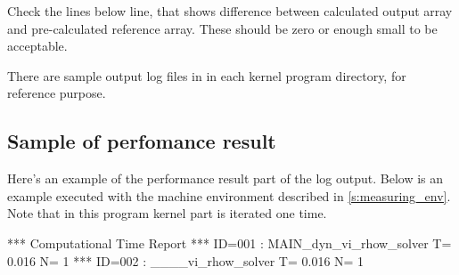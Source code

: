 Check the lines below  line,
that shows difference between calculated output array and
pre-calculated reference array.
These should be zero or enough small to be acceptable.

There are sample output log files in  
in each kernel program directory, for reference purpose.



\subsection{Sample of perfomance result}

Here's an example of the performance result part of the log output.
Below is an example executed with the machine environment described in \autoref{s:measuring_env}.
%
Note that in this program kernel part is iterated one time.

\begin{LstLog}
 *** Computational Time Report
 *** ID=001 : MAIN_dyn_vi_rhow_solver          T=     0.016 N=      1
 *** ID=002 : ____vi_rhow_solver               T=     0.016 N=      1
\end{LstLog}